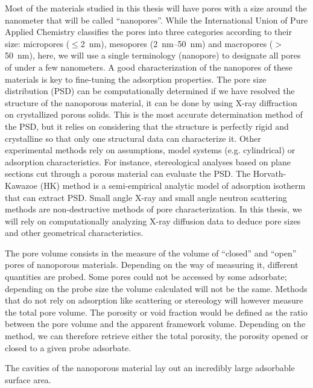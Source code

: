 \documentclass[main.tex]{subfiles}
\begin{document}
Most of the materials studied in this thesis will have pores with a size around the nanometer that will be called ``nanopores''. While the International Union of Pure Applied Chemistry classifies the pores into three categories according to their size: micropores ($\leq$\SI{2}{\nano\meter}), mesopores (\SI{2}{\nano\meter}--\SI{50}{\nano\meter}) and macropores ($>$\SI{50}{\nano\meter}),\cite{Sing_1985} here,
we will use a single terminology (nanopore) to designate all pores of under a few nanometers. A good characterization of the nanopores of these materials is key to fine-tuning the adsorption properties.\cite{Yan_2020} The pore size distribution (PSD) can be computationally determined if we have resolved the structure of the nanoporous material, it can be done by using X-ray diffraction on crystallized porous solids. This is the most accurate determination method of the PSD, but it relies on considering that the structure is perfectly rigid and crystalline so that only one structural data can characterize it. Other experimental methods rely on assumptions, model systems (e.g. cylindrical) or adsorption characteristics. For instance, stereological analyses based on plane sections cut through a porous material can evaluate the PSD.\cite{Haynes_1973} The Horvath-Kawazoe (HK) method is a semi-empirical analytic model of adsorption isotherm that can extract PSD. Small angle X-ray and small angle neutron scattering methods are non-destructive methods of pore characterization.\cite{Radlinski_2004} In this thesis, we will rely on computationally analyzing X-ray diffusion data to deduce pore sizes and other geometrical characteristics. 

The pore volume consists in the measure of the volume of ``closed'' and ``open'' pores of nanoporous materials. Depending on the way of measuring it, different quantities are probed. Some pores could not be accessed by some adsorbate; depending on the probe size the volume calculated will not be the same. Methods that do not rely on adsorption like scattering or stereology will however measure the total pore volume. The porosity or void fraction would be defined as the ratio between the pore volume and the apparent framework volume. Depending on the method, we can therefore retrieve either the total porosity, the porosity opened or closed to a given probe adsorbate. 

The cavities of the nanoporous material lay out an incredibly large adsorbable surface area.\cite{Farha_2012}
\cite{Zeo++,PoreBlazer}
\end{document}
